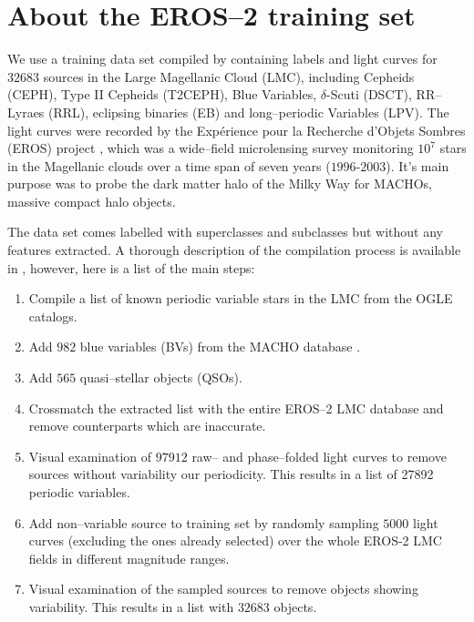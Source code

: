 \section{About the EROS--2 training set}
\label{sec:about-training-set}

We use a training data set compiled by \citet{kim2014} containing labels and light curves for $32683$ sources in the Large Magellanic Cloud (LMC), including Cepheids (CEPH), Type II Cepheids (T2CEPH), Blue Variables, $\delta$-Scuti (DSCT), RR--Lyraes (RRL), eclipsing binaries (EB) and long--periodic Variables (LPV). The light curves were recorded by the Expérience pour la Recherche d’Objets Sombres (EROS) project \citep{tisserand2007}, which was a wide--field microlensing survey monitoring $10^7$ stars in the Magellanic clouds over a time span of seven years ($1996$-$2003$). It's main purpose was to probe the dark matter halo of the Milky Way for MACHOs, massive compact halo objects.\\



The data set comes labelled with superclasses and subclasses but without any features extracted. A thorough description of the compilation process is available in \citet{kim2014}, however, here is a list of the main steps:

\begin{enumerate}
\item Compile a list of known periodic variable stars in the LMC from the OGLE \citep{udalski2008, soszy2008} catalogs.
\item Add $982$ blue variables (BVs) from the MACHO database \citep{keller2002}.
\item Add $565$ quasi--stellar objects (QSOs).
\item Crossmatch the extracted list with the entire EROS--2 LMC database and remove counterparts which are inaccurate.
\item Visual examination of $97912$ raw-- and phase--folded light curves to remove sources without variability our periodicity. This results in a list of 27892 periodic variables.
\item Add non--variable source to training set by randomly sampling $5000$ light curves (excluding the ones already selected) over the whole EROS-2 LMC fields in different magnitude ranges.
\item Visual examination of the sampled sources to remove objects showing variability. This results in a list with $32683$ objects.
\end{enumerate}

